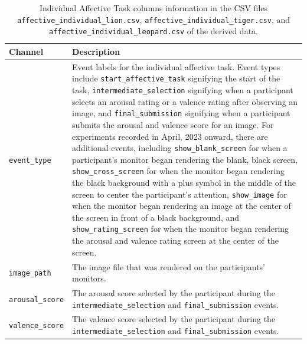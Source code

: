 \begin{table}
\centering
\begin{tabularx}{\textwidth}{lX}
    \toprule
    Channel & Description \\\midrule
    \texttt{event\_type} & Event labels for the individual affective task. Event types include \texttt{start\_affective\_task} signifying the start of the task, \texttt{intermediate\_selection} signifying when a participant selects an arousal rating or a valence rating after observing an image, and \texttt{final\_submission} signifying when a participant submits the arousal and valence score for an image. For experiments recorded in April, 2023 onward, there are additional events, including \texttt{show\_blank\_screen} for when a participant's monitor began rendering the blank, black screen, \texttt{show\_cross\_screen} for when the monitor began rendering the black background with a plus symbol in the middle of the screen to center the participant's attention, \texttt{show\_image} for when the monitor began rendering an image at the center of the screen in front of a black background, and \texttt{show\_rating\_screen} for when the monitor began rendering the arousal and valence rating screen at the center of the screen.\\
    \texttt{image\_path} & The image file that was rendered on the participants' monitors.\\
    \texttt{arousal\_score} & The arousal score selected by the participant during the \texttt{intermediate\_selection} and \texttt{final\_submission} events.\\
    \texttt{valence\_score} & The valence score selected by the participant during the \texttt{intermediate\_selection} and \texttt{final\_submission} events.\\
\bottomrule
\end{tabularx}
\caption{Individual Affective Task columns information in the CSV files \texttt{affective\_individual\_lion.csv}, \texttt{affective\_individual\_tiger.csv}, and \texttt{affective\_individual\_leopard.csv} of the derived data.}
\label{tab:individual_affective_task_columns}
\end{table}


